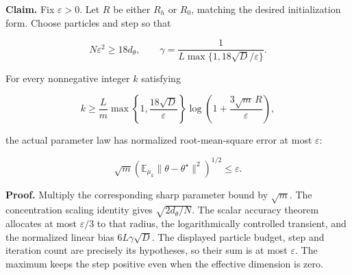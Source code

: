 \documentclass[11pt,a4paper]{report}
\begin{document}
\textbf{Claim.} Fix \(\varepsilon>0\). Let \(R\) be either \(R_h\) or \(R_0\), matching the desired initialization form. Choose particles and step so that

\[N\varepsilon^2\ge18d_\theta,\qquad \gamma=\frac1{L\max\{1,18\sqrt D/\varepsilon\}}.\]


For every nonnegative integer \(k\) satisfying

\[k\ge\frac Lm\max\!\left\{1,\frac{18\sqrt D}{\varepsilon}\right\}\log\!\left(1+\frac{3\sqrt m\,R}{\varepsilon}\right),\]


the actual parameter law has normalized root-mean-square error at most \(\varepsilon\):

\[\sqrt m\left(\mathbb E_{\mu_k}\|\theta-\theta^\star\|^2\right)^{1/2}\le\varepsilon.\]


\textbf{Proof.} Multiply the corresponding sharp parameter bound by \(\sqrt m\). The concentration scaling identity gives \(\sqrt{2d_\theta/N}\). The scalar accuracy theorem allocates at most \(\varepsilon/3\) to that radius, the logarithmically controlled transient, and the normalized linear bias \(6L\gamma\sqrt D\). The displayed particle budget, step and iteration count are precisely its hypotheses, so their sum is at most \(\varepsilon\). The maximum keeps the step positive even when the effective dimension is zero.
\end{document}
